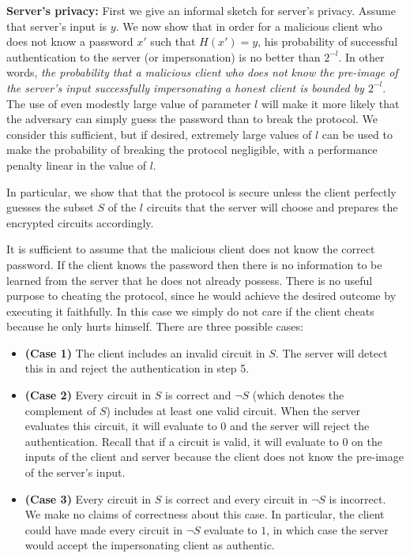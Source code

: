 \noindent
{\bf Server's privacy:} First we give an informal sketch for server's
privacy. Assume that server's input is $y$.  We now show that in order
for a malicious client who does not know a password $x'$ such that
$H(x') = y$, his probability of successful authentication to the
server (or impersonation) is no better than $2^{-l}$. In other words,
{\it the probability that a malicious client who does not know the
pre-image of the server's input successfully impersonating a honest client is bounded
by $2^{-l}$}. The use of even modestly large value of 
parameter $l$ will make it more likely that the adversary can simply
guess the password than to break the protocol. We consider this
sufficient, but if desired, extremely large values of $l$ can be used
to make the probability of breaking the protocol negligible, with a
performance penalty linear in the value of $l$. 

In particular, we show that that the protocol is secure unless the
client perfectly guesses the subset $S$ of the $l$ circuits that
the server will choose and prepares the encrypted circuits accordingly.

It is sufficient to assume that the malicious client does not know the
correct password. If the client knows the password then there is no
information to be learned from the server that he does not already
possess. There is no useful purpose to cheating the protocol, since he
would achieve the desired outcome by executing it faithfully. In this
case we simply do not care if the client cheats because he only hurts
himself. There are three possible cases:
\begin{itemize}
\item {\bf (Case 1)} The client includes an invalid circuit in $S$. The server
will detect this in and reject the authentication
in step 5.

\item {\bf (Case 2)} Every circuit in $S$ is correct and $\neg S$ (which
denotes the complement of $S$) includes at least
one valid circuit. When the server evaluates this circuit, it will
evaluate to $0$ and the server will reject
the authentication. Recall that if a circuit is valid, it will evaluate
to $0$ on the inputs of the client and server because the client does not
know the pre-image of the server's input.

\item {\bf (Case 3)} Every circuit in $S$ is correct and every circuit
in $\neg S$ is incorrect. We make no claims of correctness about this
case. In particular, the client could have made every circuit in $\neg S$
evaluate to $1$, in which case the server would accept the impersonating
client as authentic.  

\end{itemize}

